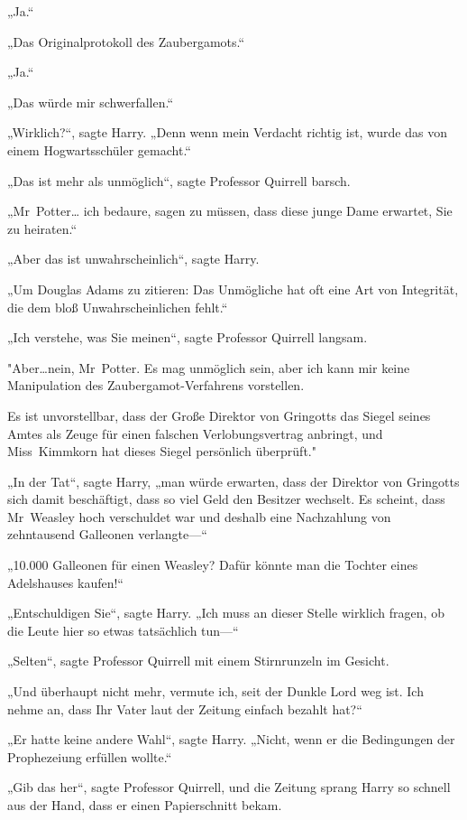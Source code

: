 {„Ja.“

„Das Originalprotokoll des Zaubergamots.“

„Ja.“

„Das würde mir schwerfallen.“

„Wirklich?“, sagte Harry. „Denn wenn mein Verdacht richtig ist, wurde das von einem Hogwartsschüler gemacht.“

„Das ist mehr als unmöglich“, sagte Professor Quirrell barsch.

„Mr~Potter… ich bedaure, sagen zu müssen, dass diese junge Dame erwartet, Sie zu heiraten.“

„Aber das ist unwahrscheinlich“, sagte Harry.

„Um Douglas Adams zu zitieren: Das Unmögliche hat oft eine Art von Integrität, die dem bloß Unwahrscheinlichen fehlt.“

„Ich verstehe, was Sie meinen“, sagte Professor Quirrell langsam.

"Aber…nein, Mr~Potter. Es mag unmöglich sein, aber ich kann mir keine Manipulation des Zaubergamot-Verfahrens vorstellen.

Es ist unvorstellbar, dass der Große Direktor von Gringotts das Siegel seines Amtes als Zeuge für einen falschen Verlobungsvertrag anbringt, und Miss~Kimmkorn hat dieses Siegel persönlich überprüft."

„In der Tat“, sagte Harry, „man würde erwarten, dass der Direktor von Gringotts sich damit beschäftigt, dass so viel Geld den Besitzer wechselt. Es scheint, dass Mr~Weasley hoch verschuldet war und deshalb eine Nachzahlung von zehntausend Galleonen verlangte—“

„10.000 Galleonen für einen Weasley? Dafür könnte man die Tochter eines Adelshauses kaufen!“

„Entschuldigen Sie“, sagte Harry. „Ich muss an dieser Stelle wirklich fragen, ob die Leute hier so etwas tatsächlich tun—“

„Selten“, sagte Professor Quirrell mit einem Stirnrunzeln im Gesicht.

„Und überhaupt nicht mehr, vermute ich, seit der Dunkle Lord weg ist. Ich nehme an, dass Ihr Vater laut der Zeitung einfach bezahlt hat?“

„Er hatte keine andere Wahl“, sagte Harry. „Nicht, wenn er die Bedingungen der Prophezeiung erfüllen wollte.“

„Gib das her“, sagte Professor Quirrell, und die Zeitung sprang Harry so schnell aus der Hand, dass er einen Papierschnitt bekam.

}
